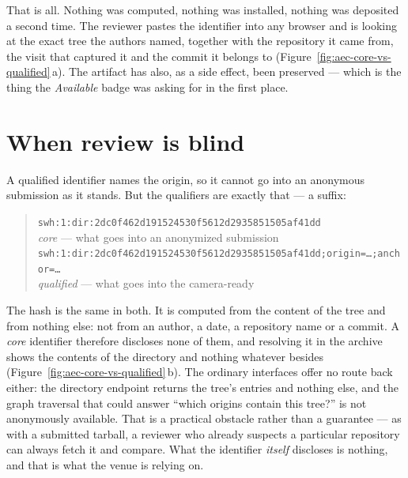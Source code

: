 That is all. Nothing was computed, nothing was installed, nothing was deposited a second time.
The reviewer pastes the identifier into any browser and is looking at the exact tree the authors
named, together with the repository it came from, the visit that captured it and the commit it
belongs to (Figure~\ref{fig:aec-core-vs-qualified}\,a). The artifact has also, as a side effect,
been preserved --- which is the thing the \emph{Available} badge was asking for in the first place.


\section{When review is blind}
\label{sec:aec-blind}

A qualified identifier names the origin, so it cannot go into an anonymous submission as it
stands. But the qualifiers are exactly that --- a suffix:

\begin{quote}\footnotesize
\texttt{swh:1:dir:2dc0f462d191524530f5612d2935851505af41dd}\\
\hspace*{1.5em}\emph{core} --- what goes into an anonymized submission\\[3pt]
\texttt{swh:1:dir:2dc0f462d191524530f5612d2935851505af41dd;origin=\dots;anchor=\dots}\\
\hspace*{1.5em}\emph{qualified} --- what goes into the camera-ready
\end{quote}

\noindent The hash is the same in both. It is computed from the content of the tree and from
nothing else: not from an author, a date, a repository name or a commit. A \emph{core} identifier
therefore discloses none of them, and resolving it in the archive shows the contents of the
directory and nothing whatever besides (Figure~\ref{fig:aec-core-vs-qualified}\,b). The ordinary
interfaces offer no route back either: the directory endpoint returns the tree's entries and
nothing else, and the graph traversal that could answer \enquote{which origins contain this
tree?} is not anonymously available. That is a practical obstacle rather than a guarantee --- as
with a submitted tarball, a reviewer who already suspects a particular repository can always
fetch it and compare. What the identifier \emph{itself} discloses is nothing, and that is what
the venue is relying on.

